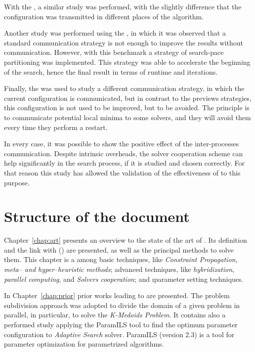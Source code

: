 With the \carrp{}, a similar study was performed, with the slightly difference that the configuration was transmitted in different places of the algorithm.

Another study was performed using the \nqp{}, in which it was observed that a standard communication strategy is not enough to improve the results without communication. However, with this benchmark a strategy of search-pace partitioning was implemented. This strategy was able to accelerate the beginning of the search, hence the final result in terms of runtime and iterations.

Finally, the \grp{} was used to study a different communication strategy, in which the current configuration is communicated, but in contrast to the previews strategies, this configuration is not used to be improved, but to be avoided. The principle is to communicate potential local minima to some solvers, and they will avoid them every time they perform a restart. 

In every case, it was possible to show the positive effect of the inter-processes communication. Despite intrinsic overheads, the solver cooperation scheme can help significantly in the search process, if it is studied and chosen correctly. For that reason this study has allowed the validation of the effectiveness of \posl{} to this purpose.

\section{Structure of the document}

Chapter~\ref{chap:art} presents an overview to the state of the art of \COPs{}. Its definition and the link with \CSPs{} (\csp) are presented, as well as the principal methods to solve them. This chapter is a  among basic techniques, like {\it Constraint Propagation}, {\it meta-- and hyper--heuristic methods}; advanced techniques, like {\it hybridization}, {\it parallel computing}, and {\it Solvers cooperation}; and {\i parameter setting techniques}.

In Chapter~\ref{chap:prior} prior works leading to \posl{} are presented. The problem subdivision approach was adopted to divide the domain of a given problem in parallel, in particular, to solve the \textit{K-Medoids Problem}. It contains also a performed study applying the {\sc ParamILS} tool to find the optimum parameter configuration to \textit{Adaptive Search} solver. {\sc ParamILS} (version 2.3) is a tool for parameter optimization for parametrized algorithms.

